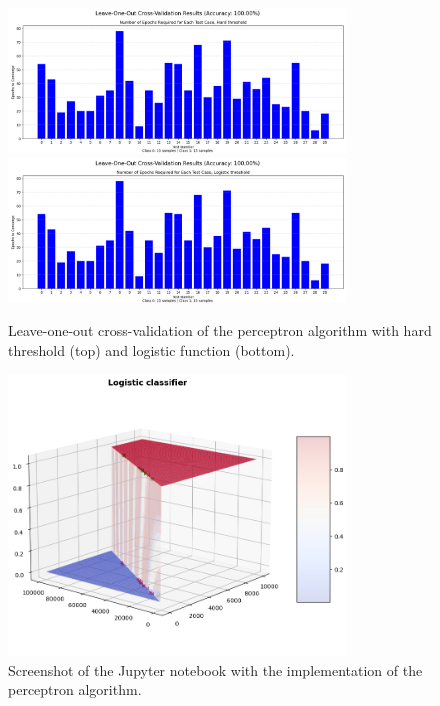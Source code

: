 \documentclass[a4paper]{article}
\begin{document}
\begin{figure}
    \centering
    \includegraphics[width=0.8\textwidth]{figures/classifier result 1.png}
    \includegraphics[width=0.8\textwidth]{figures/classifier result 2.png}
    \caption{Leave-one-out cross-validation of the perceptron algorithm with hard threshold (top) and logistic function (bottom).}
    \label{fig:classifier_result}
\end{figure}


\begin{figure}
    \centering
    \includegraphics[width=0.8\textwidth]{figures/logistic classifier.png}
    \caption{Screenshot of the Jupyter notebook with the implementation of the perceptron algorithm.}
    \label{fig:logistic_classifier}
\end{figure}
\end{document}
